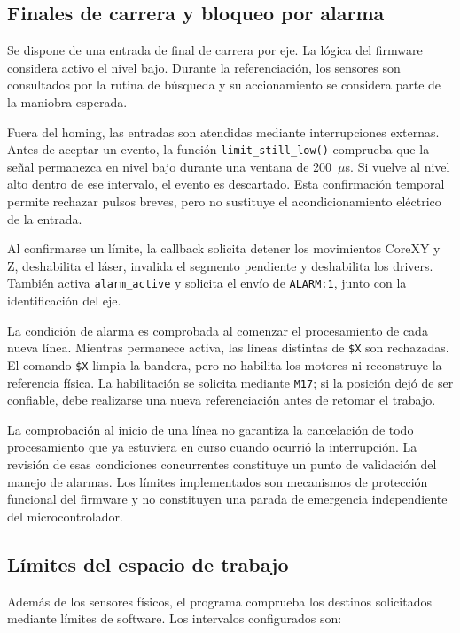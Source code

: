 \documentclass[blue,fullpaper]{ludusofficial}  %
\begin{document}
\subsection{Finales de carrera y bloqueo por alarma}

Se dispone de una entrada de final de carrera por eje.
La lógica del firmware considera activo el nivel bajo.
Durante la referenciación, los sensores son consultados
por la rutina de búsqueda y su accionamiento se considera
parte de la maniobra esperada.

Fuera del homing, las entradas son atendidas mediante
interrupciones externas. Antes de aceptar un evento,
la función \texttt{limit\_still\_low()} comprueba que
la señal permanezca en nivel bajo durante una ventana
de 200~$\mu$s. Si vuelve al nivel alto dentro de ese
intervalo, el evento es descartado. Esta confirmación
temporal permite rechazar pulsos breves, pero no sustituye
el acondicionamiento eléctrico de la entrada.

Al confirmarse un límite, la callback solicita detener
los movimientos CoreXY y Z, deshabilita el láser,
invalida el segmento pendiente y deshabilita los drivers.
También activa \texttt{alarm\_active} y solicita el envío
de \texttt{ALARM:1}, junto con la identificación del eje.

La condición de alarma es comprobada al comenzar
el procesamiento de cada nueva línea. Mientras permanece
activa, las líneas distintas de \texttt{\$X} son rechazadas.
El comando \texttt{\$X} limpia la bandera, pero no habilita
los motores ni reconstruye la referencia física.
La habilitación se solicita mediante \texttt{M17};
si la posición dejó de ser confiable, debe realizarse
una nueva referenciación antes de retomar el trabajo.

La comprobación al inicio de una línea no garantiza
la cancelación de todo procesamiento que ya estuviera
en curso cuando ocurrió la interrupción. La revisión
de esas condiciones concurrentes constituye un punto
de validación del manejo de alarmas. Los límites
implementados son mecanismos de protección funcional
del firmware y no constituyen una parada de emergencia
independiente del microcontrolador.

\subsection{Límites del espacio de trabajo}

Además de los sensores físicos, el programa comprueba
los destinos solicitados mediante límites de software.
Los intervalos configurados son:
\end{document}
